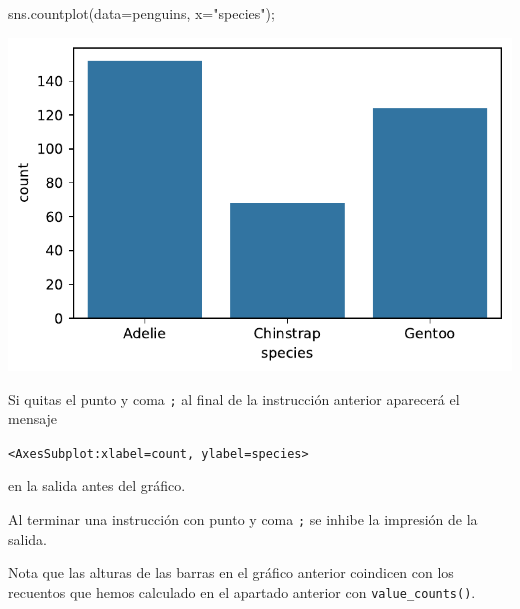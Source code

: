 \documentclass[
  a4paper,
  noprof,
  12pt,
  notoc,
  nosols,
  nobib]{mnye}
\newenvironment{Shaded}{\begin{snugshade}}{\end{snugshade}}
\newcommand{\NormalTok}[1]{\textcolor[rgb]{0.00,0.23,0.31}{#1}}
\newcommand{\OperatorTok}[1]{\textcolor[rgb]{0.37,0.37,0.37}{#1}}
\newcommand{\StringTok}[1]{\textcolor[rgb]{0.13,0.47,0.30}{#1}}
\theoremstyle{definition}
\theoremstyle{remark}
\begin{document}
\begin{Shaded}
\begin{Highlighting}[]
\NormalTok{sns.countplot(data}\OperatorTok{=}\NormalTok{penguins, x}\OperatorTok{=}\StringTok{"species"}\NormalTok{)}\OperatorTok{;}
\end{Highlighting}
\end{Shaded}

\includegraphics{chapters/1categorical_files/figure-pdf/cell-6-output-1.pdf}

\begin{tcolorbox}[enhanced jigsaw, colframe=quarto-callout-note-color-frame, rightrule=.15mm, breakable, left=2mm, bottomrule=.15mm, arc=.35mm, leftrule=.75mm, opacityback=0, toprule=.15mm, colback=white]
\begin{minipage}[t]{5.5mm}
\textcolor{quarto-callout-note-color}{\faInfo}
\end{minipage}%
\begin{minipage}[t]{\textwidth - 5.5mm}

Si quitas el punto y coma \texttt{;} al final de la instrucción anterior
aparecerá el mensaje

\texttt{\textless{}AxesSubplot:xlabel=\textquotesingle{}count\textquotesingle{},\ ylabel=\textquotesingle{}species\textquotesingle{}\textgreater{}}

en la salida antes del gráfico.

Al terminar una instrucción con punto y coma \texttt{;} se inhibe la
impresión de la salida.

\end{minipage}%
\end{tcolorbox}

Nota que las alturas de las barras en el gráfico anterior coindicen con
los recuentos que hemos calculado en el apartado anterior con
\texttt{value\_counts()}.
\end{document}
